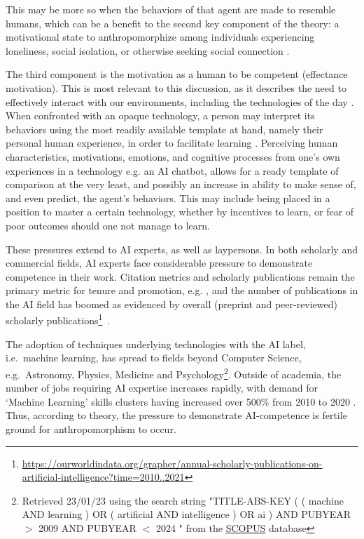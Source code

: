 This may be more so when the behaviors of that agent are made to resemble humans, which can be a benefit to the second key component of the theory: a motivational state to anthropomorphize among individuals experiencing loneliness, social isolation, or otherwise seeking social connection \citep{epley2007seeing, waytz2010social}.

The third component is the motivation as a human to be competent (effectance motivation). This is most relevant to this discussion, as it describes the need to effectively interact with our environments, including the technologies of the day \citep{epley2007seeing}. When confronted with an opaque technology, a person may interpret its behaviors using the most readily available template at hand, namely their personal human experience, in order to facilitate learning \citep{epley2007seeing, waytz2010social}. Perceiving human characteristics, motivations, emotions, and cognitive processes from one's own experiences in a technology e.g. an AI chatbot, allows for a ready template of comparison at the very least, and possibly an increase in ability to make sense of, and even predict, the agent's behaviors. This may include being placed in a position to master a certain technology, whether by incentives to learn, or fear of poor outcomes should one not manage to learn. 

These pressures extend to AI experts, as well as laypersons. In both scholarly and commercial fields, AI experts face considerable pressure to demonstrate competence in their work. Citation metrics and scholarly publications remain the primary metric for tenure and promotion, e.g. \citep{alperin2019significant}, and the number of publications in the AI field has boomed as evidenced by overall (preprint and peer-reviewed) scholarly publications\footnote{\url{https://ourworldindata.org/grapher/annual-scholarly-publications-on-artificial-intelligence?time=2010..2021} }~\citep{Maslej2023-pi}.

The adoption of techniques underlying technologies with the AI label, i.e.\ machine learning, has spread to fields beyond Computer Science, e.g.\ Astronomy, Physics, Medicine and Psychology\footnote{Retrieved 23/01/23 using the search string "TITLE-ABS-KEY ( ( machine  AND  learning )  OR  ( artificial  AND  intelligence )  OR  ai )  AND  PUBYEAR  $>$  2009  AND  PUBYEAR  $<$  2024 " from the \href{https://www.scopus.com/}{SCOPUS} database}. Outside of academia, the number of jobs requiring AI expertise increases rapidly, with demand for `Machine Learning' skills clusters having increased over 500\% from 2010 to 2020 \citep{Maslej2023-pi}. Thus, according to theory, the pressure to demonstrate AI-competence is fertile ground for anthropomorphism to occur. 


